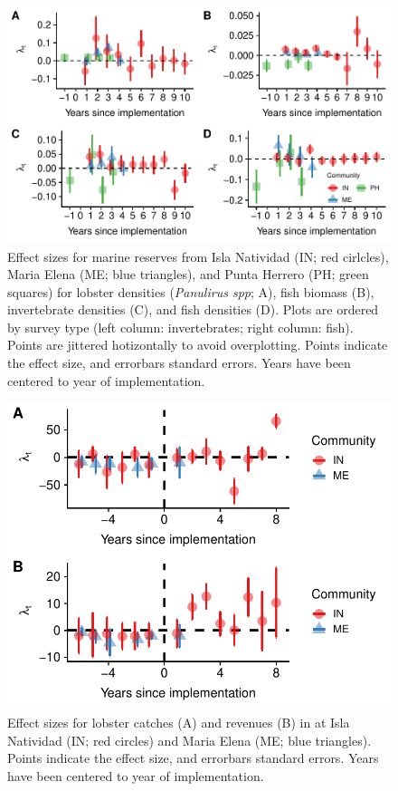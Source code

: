 \documentclass{frontiersSCNS}
\begin{document}
\clearpage

\begin{figure}
\centering
\includegraphics{Villasenor-Derbez_files/figure-latex/unnamed-chunk-4-1.pdf}
\caption{\label{fig:unnamed-chunk-4}\label{fig:indicators}Effect sizes for
marine reserves from Isla Natividad (IN; red cirlcles), Maria Elena (ME;
blue triangles), and Punta Herrero (PH; green squares) for lobster
densities (\emph{Panulirus spp}; A), fish biomass (B), invertebrate
densities (C), and fish densities (D). Plots are ordered by survey type
(left column: invertebrates; right column: fish). Points are jittered
hotizontally to avoid overplotting. Points indicate the effect size, and
errorbars standard errors. Years have been centered to year of
implementation.}
\end{figure}

\begin{figure}
\centering
\includegraphics{Villasenor-Derbez_files/figure-latex/unnamed-chunk-6-1.pdf}
\caption{\label{fig:unnamed-chunk-6}\label{fig:lobsters}Effect sizes for
lobster catches (A) and revenues (B) in at Isla Natividad (IN; red
circles) and Maria Elena (ME; blue triangles). Points indicate the
effect size, and errorbars standard errors. Years have been centered to
year of implementation.}
\end{figure}
\end{document}
